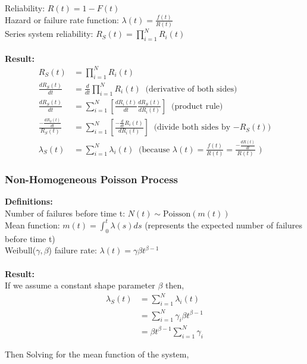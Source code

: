 \documentclass[12pt]{article}
\begin{document}
Reliability: $R(t) = 1 - F(t)$ \\
Hazard or failure rate function: $\lambda(t) = \frac{f(t)}{R(t)}$ \\
Series system reliability: $R_S(t) = \prod_{i = 1}^N R_i(t)$
\\
\\
\textbf{Result:}
$$
\begin{aligned}
	R_S(t) &= \prod_{i = 1}^N R_i(t) \\
	\frac{dR_S(t)}{dt} &= \frac{d}{dt} \prod_{i = 1}^N R_i(t) \; \; \text{(derivative of both sides)} \\
	\frac{dR_S(t)}{dt} &= \sum_{i=1}^N \left[ \frac{dR_i(t)}{dt} \frac{dR_S(t)}{dR_i(t)} \right] \; \; \text{(product rule)} \\
    \frac{-\frac{dR_S(t)}{dt}}{R_S(t)} &= \sum_{i=1}^N \left[  \frac{-\frac{d}{dt}R_i(t)}{dR_i(t)} \right] \; \; \text{(divide both sides by $-R_S(t)$)} \\
    \lambda_S(t) &= \sum_{i = 1}^N \lambda_i(t) \; \; \text{(because $\lambda(t) = \frac{f(t)}{R(t)} = \frac{-\frac{dR(t)}{dt}}{R(t)}$ )}
\end{aligned}
$$

\subsubsection{Non-Homogeneous Poisson Process}

\textbf{Definitions:} \\
\noindent
Number of failures before time t: $N(t) \sim \text{Poisson}(m(t))$ \\
Mean function: $m(t) = \int_0^t \lambda(s)ds$ (represents the expected number of failures before time t) \\
Weibull($\gamma, \beta $) failure rate: $\lambda(t) = \gamma\beta t^{\beta - 1}$
\\
\\
\textbf{Result:}\\
If we assume a constant shape parameter $\beta$ then,\\
$$
\begin{aligned}
	\lambda_S(t) &= \sum_{i = 1}^N \lambda_i(t) \\
    &= \sum_{i = 1}^N \gamma_i\beta t^{\beta - 1} \\
    &= \beta t^{\beta -1} \sum_{i = 1}^N \gamma_i
\end{aligned}
$$

Then Solving for the mean function of the system,
\end{document}
